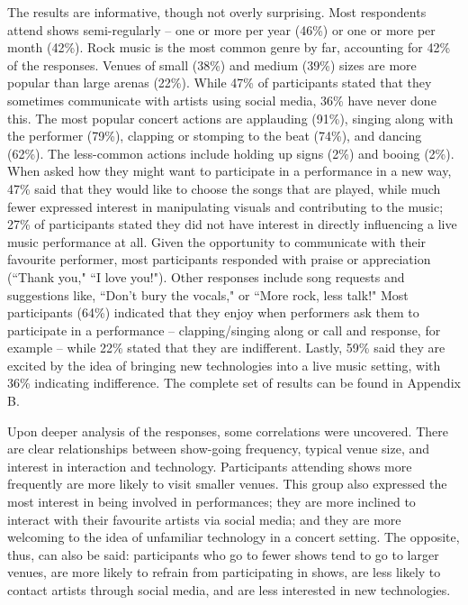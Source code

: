 The results are informative, though not overly surprising. Most respondents attend shows semi-regularly -- one or more per year (46\%) or one or more per month (42\%). Rock music is the most common genre by far, accounting for 42\% of the responses. Venues of small (38\%) and medium (39\%) sizes are more popular than large arenas (22\%). While 47\% of participants stated that they sometimes communicate with artists using social media, 36\% have never done this. The most popular concert actions are applauding (91\%), singing along with the performer (79\%), clapping or stomping to the beat (74\%), and dancing (62\%). The less-common actions include holding up signs (2\%) and booing (2\%). When asked how they might want to participate in a performance in a new way, 47\% said that they would like to choose the songs that are played, while much fewer expressed interest in manipulating visuals and contributing to the music; 27\% of participants stated they did not have interest in directly influencing a live music performance at all. Given the opportunity to communicate with their favourite performer, most participants responded with praise or appreciation (``Thank you," ``I love you!"). Other responses include song requests and suggestions like, ``Don't bury the vocals," or ``More rock, less talk!" Most participants (64\%) indicated that they enjoy when performers ask them to participate in a performance -- clapping/singing along or call and response, for example -- while 22\% stated that they are indifferent. Lastly, 59\% said they are excited by the idea of bringing new technologies into a live music setting, with 36\% indicating indifference. The complete set of results can be found in Appendix B.

Upon deeper analysis of the responses, some correlations were uncovered. There are clear relationships between show-going frequency, typical venue size, and interest in interaction and technology. Participants attending shows more frequently are more likely to visit smaller venues. This group also expressed the most interest in being involved in performances; they are more inclined to interact with their favourite artists via social media; and they are more welcoming to the idea of unfamiliar technology in a concert setting. The opposite, thus, can also be said: participants who go to fewer shows tend to go to larger venues, are more likely to refrain from participating in shows, are less likely to contact artists through social media, and are less interested in new technologies.


